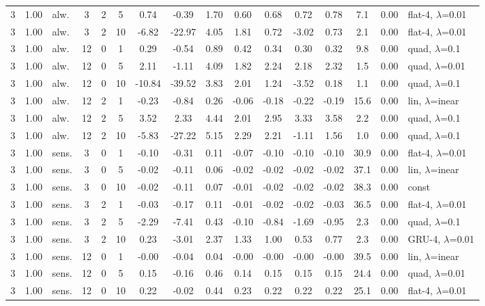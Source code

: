 \documentclass[10pt]{article}
\begin{document}
\begin{scriptsize}
\begin{longtable}{cclcc c ccc ccc c cc l}
3 & 1.00 & alw. & 3 & 2 & 5 & 0.74 & -0.39 & 1.70 & 0.60 & 0.68 & 0.72 & 0.78 & 7.1 & 0.00 & flat-4, $\lambda$=0.01 \\
3 & 1.00 & alw. & 3 & 2 & 10 & -6.82 & -22.97 & 4.05 & 1.81 & 0.72 & -3.02 & 0.73 & 2.1 & 0.00 & flat-4, $\lambda$=0.01 \\
3 & 1.00 & alw. & 12 & 0 & 1 & 0.29 & -0.54 & 0.89 & 0.42 & 0.34 & 0.30 & 0.32 & 9.8 & 0.00 & quad, $\lambda$=0.1 \\
3 & 1.00 & alw. & 12 & 0 & 5 & 2.11 & -1.11 & 4.09 & 1.82 & 2.24 & 2.18 & 2.32 & 1.5 & 0.00 & quad, $\lambda$=0.01 \\
3 & 1.00 & alw. & 12 & 0 & 10 & -10.84 & -39.52 & 3.83 & 2.01 & 1.24 & -3.52 & 0.18 & 1.1 & 0.00 & quad, $\lambda$=0.1 \\
3 & 1.00 & alw. & 12 & 2 & 1 & -0.23 & -0.84 & 0.26 & -0.06 & -0.18 & -0.22 & -0.19 & 15.6 & 0.00 & lin, $\lambda$=inear \\
3 & 1.00 & alw. & 12 & 2 & 5 & 3.52 & 2.33 & 4.44 & 2.01 & 2.95 & 3.33 & 3.58 & 2.2 & 0.00 & quad, $\lambda$=0.1 \\
3 & 1.00 & alw. & 12 & 2 & 10 & -5.83 & -27.22 & 5.15 & 2.29 & 2.21 & -1.11 & 1.56 & 1.0 & 0.00 & quad, $\lambda$=0.1 \\
3 & 1.00 & sens. & 3 & 0 & 1 & -0.10 & -0.31 & 0.11 & -0.07 & -0.10 & -0.10 & -0.10 & 30.9 & 0.00 & flat-4, $\lambda$=0.01 \\
3 & 1.00 & sens. & 3 & 0 & 5 & -0.02 & -0.11 & 0.06 & -0.02 & -0.02 & -0.02 & -0.02 & 37.1 & 0.00 & lin, $\lambda$=inear \\
3 & 1.00 & sens. & 3 & 0 & 10 & -0.02 & -0.11 & 0.07 & -0.01 & -0.02 & -0.02 & -0.02 & 38.3 & 0.00 & const \\
3 & 1.00 & sens. & 3 & 2 & 1 & -0.03 & -0.17 & 0.11 & -0.01 & -0.02 & -0.02 & -0.03 & 36.5 & 0.00 & flat-4, $\lambda$=0.01 \\
3 & 1.00 & sens. & 3 & 2 & 5 & -2.29 & -7.41 & 0.43 & -0.10 & -0.84 & -1.69 & -0.95 & 2.3 & 0.00 & quad, $\lambda$=0.1 \\
3 & 1.00 & sens. & 3 & 2 & 10 & 0.23 & -3.01 & 2.37 & 1.33 & 1.00 & 0.53 & 0.77 & 2.3 & 0.00 & GRU-4, $\lambda$=0.01 \\
3 & 1.00 & sens. & 12 & 0 & 1 & -0.00 & -0.04 & 0.04 & -0.00 & -0.00 & -0.00 & -0.00 & 39.5 & 0.00 & lin, $\lambda$=inear \\
3 & 1.00 & sens. & 12 & 0 & 5 & 0.15 & -0.16 & 0.46 & 0.14 & 0.15 & 0.15 & 0.15 & 24.4 & 0.00 & quad, $\lambda$=0.01 \\
3 & 1.00 & sens. & 12 & 0 & 10 & 0.22 & -0.02 & 0.44 & 0.23 & 0.22 & 0.22 & 0.22 & 25.1 & 0.00 & flat-4, $\lambda$=0.01 \\

\end{longtable}
\end{scriptsize}
\end{document}
